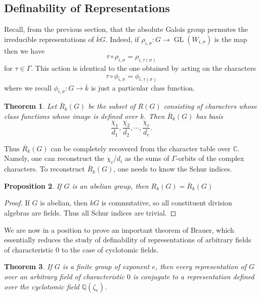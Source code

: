 \documentclass[12pt]{article}
\theoremstyle{plain}
\newtheorem{theorem}{Theorem}[section]
\newtheorem{proposition}[theorem]{Proposition}
\theoremstyle{definition}
\theoremstyle{remark}
\numberwithin{equation}{section}
\begin{document}
\subsection{Definability of Representations}

Recall, from the previous section, that the absolute Galois group
permutes the irreducible representations of $\overline{k}G$.
Indeed, if $\rho_{i,\sigma} : G \to \operatorname{GL}(W_{i,\sigma})$
is the map then we have
\[
\tau \circ \rho_{i,\sigma} = \rho_{i,\tau(\sigma)}
\]
for $\tau \in \Gamma$.
This action is identical to the one obtained by acting on the
characters
\[
\tau \circ \phi_{i,\sigma} = \phi_{i,\tau(\sigma)}
\]
where we recall $\phi_{i,\sigma}: G \to \overline{k}$ is just a
particular class function.

\begin{theorem}
Let $\overline{R}_k(G)$ be the subset of $R(G)$ consisting of characters
whose class functions whose image is defined over $k$.
Then $\overline{R}_k(G)$ has basis
\[
\frac{\chi_1}{d_1},
\frac{\chi_2}{d_2},
\cdots,
\frac{\chi_r}{d_r}.
\]
\end{theorem}

Thus $\overline{R}_k(G)$ can be completely recovered from the character
table over $\mathbb{C}$.  Namely, one can reconstruct the $\chi_i/d_i$
as the sums of $\Gamma$-orbits of the complex characters.
To reconstruct $\overline{R}_k(G)$, one needs to know the Schur indices.

\begin{proposition}
If $G$ is an abelian group,
then $R_k(G) = \overline{R}_k(G)$
\end{proposition}

\begin{proof}
If $G$ is abelian, then $kG$ is commutative, so all constituent
division algebras are fields.  Thus all Schur indices are trivial.
\end{proof}

We are now in a position to prove an important theorem of Brauer, which
essentially reduces the study of definability of representations of
arbitrary fields of characteristic $0$ to the case of cyclotomic fields.

\begin{theorem} \label{thm:define_over_cyclotomic}
If $G$ is a finite group of exponent $e$,
then every representation of $G$ over an arbitrary field of
characteristic $0$
is conjugate to a representation defined over the
cyclotomic field $\mathbb{Q}(\zeta_e)$.
\end{theorem}
\end{document}
